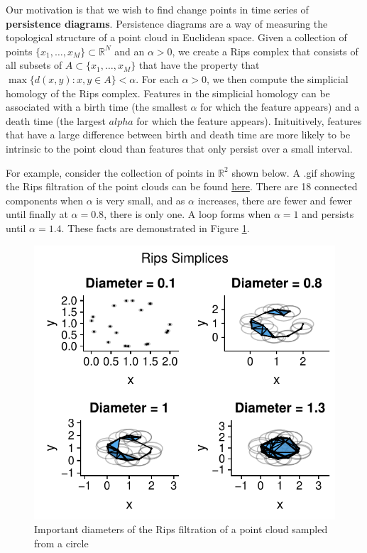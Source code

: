 \documentclass[smallextended]{svjour3}       %
\newcommand{\R}{\mathbb{R}}
\begin{document}
Our motivation is that we wish to find change points in time series of
\textbf{persistence diagrams}. Persistence diagrams are a way of
measuring the topological structure of a point cloud in Euclidean space.  Given a collection of points $\{x_1,\ldots,x_M\} \subset \R^N$ and an $\alpha > 0$, we create a Rips complex that consists of all subsets of $A \subset \{x_1,\ldots, x_M\}$ that have the property that $\max \{d(x,y) : x,y \in A\} < \alpha$. For each $\alpha > 0$, we then compute the simplicial homology of the Rips complex. Features in the simplicial homology can be associated with a birth time (the smallest $\alpha$ for which the feature appears) and a death time (the largest $alpha$ for which the feature appears). Inituitively, features that have a large difference between birth and death time are more likely to be intrinsic to the point cloud than features that only persist over a small interval. 

For example, consider the collection of points in $\mathbb{R}^2$ shown below. A .gif showing the Rips filtration of the point clouds can be found \href{http://stat.slu.edu/~speegle/Rips.gif}{here}. There are 18 connected components when $\alpha$ is very small, and as $\alpha$ increases, there are fewer and fewer until finally at $\alpha = 0.8$, there is only one. A loop forms when $\alpha = 1$ and persists until $\alpha = 1.4$. These facts are demonstrated in Figure \ref{fig:circle}. 

\begin{figure}[H]
\includegraphics[width=\columnwidth]{springer_template_files/figure-latex/rips_circle}
\caption{Important diameters of the Rips filtration of a point cloud sampled from a circle}
 \label{fig:circle}\end{figure}
\end{document}
